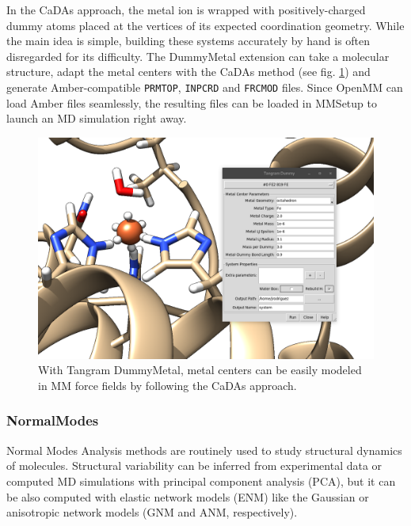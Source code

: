 In the CaDAs approach, the metal ion is wrapped with positively-charged dummy atoms placed at the vertices of its expected coordination geometry. While the main idea is simple, building these systems accurately by hand is often disregarded for its difficulty. The DummyMetal extension can take a molecular structure, adapt the metal centers with the CaDAs method (see fig. \ref{fig:tangram-dummy}) and generate Amber-compatible \texttt{PRMTOP}, \texttt{INPCRD} and \texttt{FRCMOD} files. Since OpenMM can load Amber files seamlessly, the resulting files can be loaded in MMSetup to launch an MD simulation right away.

\begin{figure}
	\begin{Center}
		\includegraphics[width=\textwidth]{./figures/05/tangram_dummy.png}
	\end{Center}
	\caption[Tangram DummyMetal]{With Tangram DummyMetal, metal centers can be easily modeled in MM force fields by following the CaDAs approach.}
	\label{fig:tangram-dummy}
\end{figure}

\subsubsection{NormalModes}
Normal Modes Analysis methods are routinely used to study structural dynamics of molecules. Structural variability can be inferred from experimental data or computed MD simulations with principal component analysis (PCA), but it can be also computed with elastic network models (ENM) like the Gaussian or anisotropic network models (GNM and ANM, respectively).

